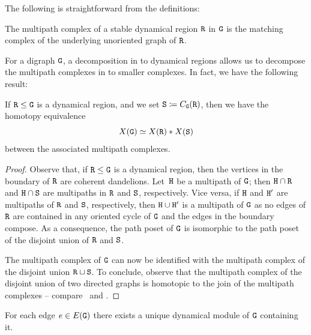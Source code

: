 \documentclass{amsart}
\begin{document}
 




The following is straightforward from the definitions:

 \begin{lem}\label{lem:alternatingmultipath}
The multipath complex of a stable dynamical region ${\tt R}$ in ${\tt G}$ is the matching complex of the underlying unoriented graph of ${\tt R}$.
\end{lem}

For a digraph ${\tt G}$, a decomposition in to dynamical regions allows us to decompose the multipath complexes in to smaller complexes. In fact, we have the following result:




 
 \begin{prop}\label{prop:regions}
 If  ${\tt R}\leq {\tt G}$ is a dynamical region, and we set ${\tt S}\coloneqq C_{{\tt G}}({\tt R})$, then we have the homotopy equivalence
 \[
 X({\tt G}) \simeq X({\tt R}) \ast X({\tt S})
 \]
 between the associated multipath complexes.
\end{prop}

 \begin{proof}
 Observe that, if ${\tt R}\leq {\tt G}$ is a dynamical region, then the vertices in the boundary of ${\tt R}$ are coherent dandelions. Let~${\tt H}$ be a multipath of ${\tt G}$; then ${\tt H}\cap {\tt R}$ and ${\tt H} \cap {\tt S}$ are multipaths in ${\tt R}$ and ${\tt S}$, respectively. 
 Vice versa, if ${\tt H}$ and ${\tt H}'$ are multipaths of ${\tt R}$ and ${\tt S}$, respectively, then ${\tt H}\cup {\tt H}'$ is a multipath of ${\tt G}$ as no edges of ${\tt R}$ are contained in any oriented cycle of ${\tt G}$ and the edges in the boundary compose. As a consequence, the path poset of ${\tt G}$ is isomorphic to the path poset of the disjoint union of ${\tt R}$ and $ {\tt S}$. 
 
 The multipath complex of ${\tt G}$ can now be identified with the multipath complex of the disjoint union ${\tt R}\sqcup {\tt S}$.
  To conclude, observe that the multipath complex of the disjoint union of two directed graphs is homotopic to the join of the multipath complexes -- compare~\cite[Definition 2.16]{Kozlov} and \cite[Remark~3.2]{secondo}.
 \end{proof}





\begin{lem}
For each edge $e\in E({\tt G})$ there exists a unique dynamical module of ${\tt G}$ containing it. 
\end{lem}
\end{document}
